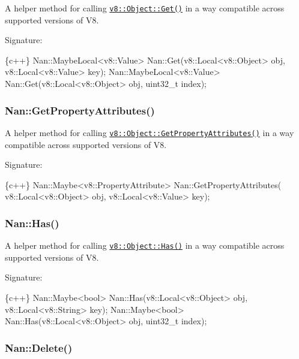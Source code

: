 A helper method for calling \href{https://v8docs.nodesource.com/io.js-3.0/db/d85/classv8_1_1_object.html#a2565f03e736694f6b1e1cf22a0b4eac2}{\tt {\ttfamily v8\+::\+Object\+::\+Get()}} in a way compatible across supported versions of V8.

Signature\+:


\begin{DoxyCode}
\{c++\}
Nan::MaybeLocal<v8::Value> Nan::Get(v8::Local<v8::Object> obj,
                                    v8::Local<v8::Value> key);
Nan::MaybeLocal<v8::Value> Nan::Get(v8::Local<v8::Object> obj, uint32\_t index);
\end{DoxyCode}


\label{_api_nan_get_property_attribute}%
 \subsubsection*{Nan\+::\+Get\+Property\+Attributes()}

A helper method for calling \href{https://v8docs.nodesource.com/io.js-3.0/db/d85/classv8_1_1_object.html#a9b898894da3d1db2714fd9325a54fe57}{\tt {\ttfamily v8\+::\+Object\+::\+Get\+Property\+Attributes()}} in a way compatible across supported versions of V8.

Signature\+:


\begin{DoxyCode}
\{c++\}
Nan::Maybe<v8::PropertyAttribute> Nan::GetPropertyAttributes(
    v8::Local<v8::Object> obj,
    v8::Local<v8::Value> key);
\end{DoxyCode}


\label{_api_nan_has}%
 \subsubsection*{Nan\+::\+Has()}

A helper method for calling \href{https://v8docs.nodesource.com/io.js-3.0/db/d85/classv8_1_1_object.html#ab3c3d89ea7c2f9afd08965bd7299a41d}{\tt {\ttfamily v8\+::\+Object\+::\+Has()}} in a way compatible across supported versions of V8.

Signature\+:


\begin{DoxyCode}
\{c++\}
Nan::Maybe<bool> Nan::Has(v8::Local<v8::Object> obj, v8::Local<v8::String> key);
Nan::Maybe<bool> Nan::Has(v8::Local<v8::Object> obj, uint32\_t index);
\end{DoxyCode}


\label{_api_nan_delete}%
 \subsubsection*{Nan\+::\+Delete()}


